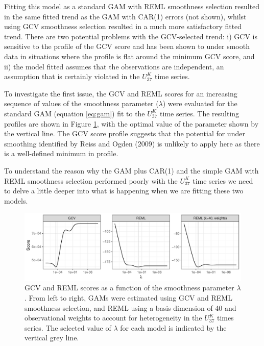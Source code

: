 \documentclass[12pt,]{article}
\newcommand{\uk}{\ensuremath{\mathit{U}^{\mathit{K}}_{\mathup{37}}}}
\begin{document}
Fitting this model as a standard GAM with REML smoothness selection
resulted in the same fitted trend as the GAM with CAR(1) errors (not
shown), whilst using GCV smoothness selection resulted in a much more
satisfactory fitted trend. There are two potential problems with the
GCV-selected trend: i) GCV is sensitive to the profile of the GCV score
and has been shown to under smooth data in situations where the profile
is flat around the minimum GCV score, and ii) the model fitted assumes
that the observations are independent, an assumption that is certainly
violated in the \uk{} time series.

To investigate the first issue, the GCV and REML scores for an
increasing sequence of values of the smoothness parameter (\(\lambda\))
were evaluated for the standard GAM (equation \eqref{eq:gam}) fit to the
\uk{} time series. The resulting profiles are shown in Figure
\ref{fig:trace-smoothness-parameters}, with the optimal value of the
parameter shown by the vertical line. The GCV score profile suggests
that the potential for under smoothing identified by Reiss and Ogden
(2009) is unlikely to apply here as there is a well-defined minimum in
profile.

To understand the reason why the GAM plus CAR(1) and the simple GAM with
REML smoothness selection performed poorly with the \uk{} time series we
need to delve a little deeper into what is happening when we are fitting
these two models.

\begin{figure}

{\centering \includegraphics[width=0.8\linewidth]{manuscript_files/figure-latex/trace-smoothness-parameters-1} 

}

\caption{GCV and REML scores as a function of the smoothness parameter $\lambda$. From left to right, GAMs were estimated using GCV and REML smoothness selection, and REML using a basis dimension of 40 and observational weights to account for heterogeneity in the \uk{} times series. The selected value of $\lambda$ for each model is indicated by the vertical grey line.}\label{fig:trace-smoothness-parameters}
\end{figure}
\end{document}
